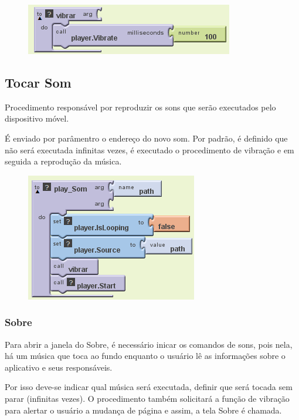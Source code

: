 \documentclass[portugues, brazil, a4paper,12pt]{article}
\begin{document}
\begin{figure}[H]
	\centering
	\includegraphics[scale=.8]{img/monitoramento/vibrar.png}
	
\end{figure}

\subsection{Tocar Som}
Procedimento responsável por reproduzir os sons que serão executados pelo dispositivo móvel. 

É enviado por parâmentro o endereço do novo som. Por padrão, é definido que não será executada infinitas vezes, é executado o procedimento de vibração e em seguida a reprodução da música.

\begin{figure}[H]
	\centering
	\includegraphics[scale=.8]{img/monitoramento/abreSom.png}
	
\end{figure}

\subsubsection{Sobre}
Para abrir a janela do Sobre, é necessário inicar os comandos de sons, pois nela, há um música que toca ao fundo enquanto o usuário lê as informações sobre o aplicativo e seus responsáveis.

Por isso deve-se indicar qual música será executada, definir que será tocada sem parar (infinitas vezes). O procedimento também solicitará a função de vibração para alertar o usuário a mudança de página e assim, a tela Sobre é chamada.
\end{document}

